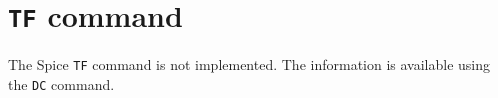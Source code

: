 %
%
%
%
\section{{\tt TF} command}
The Spice {\tt TF} command is not implemented.  The information
is available using the {\tt DC} command.
